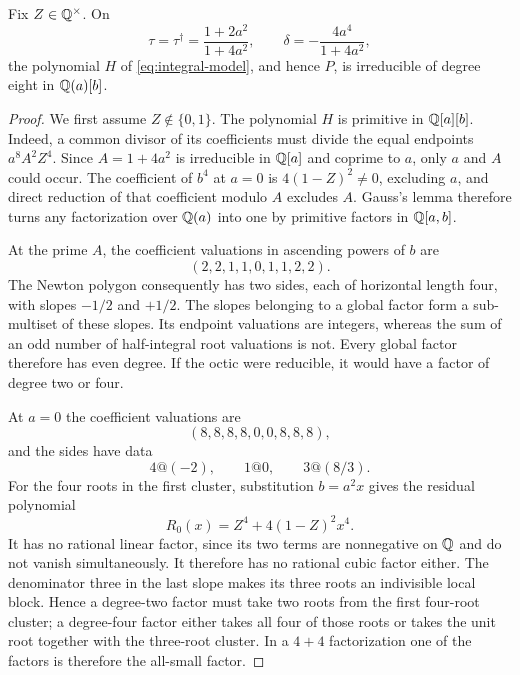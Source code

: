 \begin{theorem}
\label{thm:fiber-irred}
Fix $Z\in\mathbb{Q}^\times$.  On
\[
 \tau=\tau^\dagger=\frac{1+2a^2}{1+4a^2},
 \qquad
 \delta=-\frac{4a^4}{1+4a^2},
\]
the polynomial $H$ of \eqref{eq:integral-model}, and hence $P$, is
irreducible of degree eight in $\mathbb{Q}(a)[b]$.
\end{theorem}

\begin{proof}
We first assume $Z\notin\{0,1\}$.  The polynomial $H$ is primitive in
$\mathbb{Q}[a][b]$.  Indeed, a common divisor of its coefficients must divide the
equal endpoints $a^8A^2Z^4$.  Since $A=1+4a^2$ is irreducible in $\mathbb{Q}[a]$
and coprime to $a$, only $a$ and $A$ could occur.  The coefficient of
$b^4$ at $a=0$ is $4(1-Z)^2\ne0$, excluding $a$, and direct reduction of
that coefficient modulo $A$ excludes $A$.  Gauss's lemma therefore turns
any factorization over $\mathbb{Q}(a)$ into one by primitive factors in
$\mathbb{Q}[a,b]$.

At the prime $A$, the coefficient valuations in ascending powers of $b$
are
\[
 (2,2,1,1,0,1,1,2,2).
\]
The Newton polygon consequently has two sides, each of horizontal length
four, with slopes $-1/2$ and $+1/2$.  The slopes belonging to a global
factor form a sub-multiset of these slopes.  Its endpoint valuations are
integers, whereas the sum of an odd number of half-integral root
valuations is not.  Every global factor therefore has even degree.  If
the octic were reducible, it would have a factor of degree two or four.

At $a=0$ the coefficient valuations are
\[
 (8,8,8,8,0,0,8,8,8),
\]
and the sides have data
\[
 4@(-2),\qquad 1@0,\qquad 3@(8/3).
\]
For the four roots in the first cluster, substitution $b=a^2x$ gives the
residual polynomial
\begin{equation}
 R_0(x)=Z^4+4(1-Z)^2x^4.               \label{eq:small-residual}
\end{equation}
It has no rational linear factor, since its two terms are nonnegative on
$\mathbb{Q}$ and do not vanish simultaneously.  It therefore has no rational
cubic factor either.  The denominator three in the last slope makes its
three roots an indivisible local block.  Hence a degree-two factor must
take two roots from the first four-root cluster; a degree-four factor
either takes all four of those roots or takes the unit root together with
the three-root cluster.  In a $4+4$ factorization one of the factors is
therefore the all-small factor.


\end{proof}
